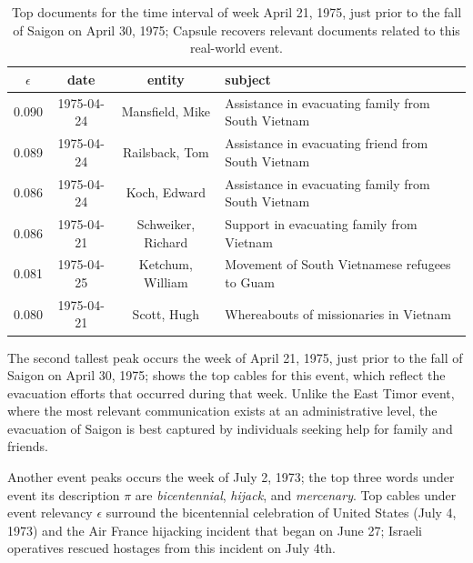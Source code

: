 \begin{table}[htb]
\small
\centering
\begin{tabular}{cccl}
\toprule
$\epsilon$ & date & entity & subject \\
\midrule
0.090   &  1975-04-24  &  Mansfield, Mike & Assistance in evacuating family from South Vietnam \\
0.089   &  1975-04-24  &  Railsback, Tom & Assistance in evacuating friend from South Vietnam \\
0.086   &  1975-04-24  &  Koch, Edward & Assistance in evacuating family from South Vietnam \\
0.086   &  1975-04-21  &  Schweiker, Richard & Support in evacuating family from Vietnam \\
0.081   &  1975-04-25  &  Ketchum, William & Movement of South Vietnamese refugees to Guam \\
0.080   &  1975-04-21  &  Scott, Hugh & Whereabouts of missionaries in Vietnam \\
\bottomrule
\end{tabular}
\label{tab:saigon}
\caption{Top documents for the time interval of week April 21, 1975, just prior to the fall of Saigon on April 30, 1975; Capsule recovers relevant documents related to this real-world event.}
\end{table}

The second tallest peak occurs the week of April 21, 1975, just prior to the fall of Saigon on April 30, 1975;  shows the top cables for this event, which reflect the evacuation efforts that occurred during that week.  Unlike the East Timor event, where the most relevant communication exists at an administrative level, the evacuation of Saigon is best captured by individuals seeking help for family and friends.

Another event peaks occurs the week of July 2, 1973; the top three words under event its description $\pi$ are \emph{bicentennial}, \emph{hijack}, and \emph{mercenary}.  Top cables under event relevancy $\epsilon$ surround the bicentennial celebration of United States (July 4, 1973) and the Air France hijacking incident that began on June 27; Israeli operatives rescued hostages from this incident on July 4th.


